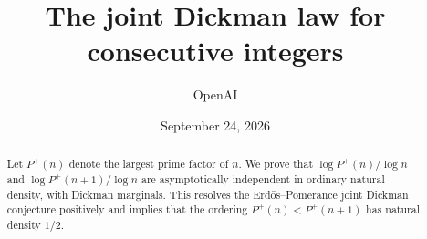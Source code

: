 \documentclass[11pt]{article}
\title{The joint Dickman law for consecutive integers}
\author{OpenAI}
\date{September 24, 2026}
\begin{document}
\maketitle
\begin{abstract}
Let $P^+(n)$ denote the largest prime factor of $n$. We prove that
$\log P^+(n)/\log n$ and $\log P^+(n+1)/\log n$ are asymptotically
independent in ordinary natural density, with Dickman marginals. This resolves the Erd\H{o}s--Pomerance
joint Dickman conjecture positively and implies that the ordering
$P^+(n)<P^+(n+1)$ has natural density $1/2$.
\end{abstract}
\tableofcontents
\clearpage











\renewcommand{\bibsection}{\section*{References}\addcontentsline{toc}{section}{References}}


\end{document}
